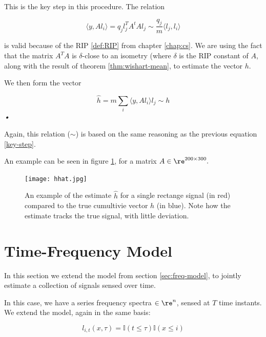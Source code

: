 \begin{remark}
This is the key step in this procedure. The relation 

\begin{equation}
\langle y, Al_i\rangle = q_j  l_j^TA^tAl_j \sim \frac{q_j}{m} \langle l_j, l_i \rangle
\end{equation}

is valid because of the RIP \eqref{def:RIP} from chapter \ref{chap:cs}. We are using the fact that the matrix \(A^TA\) is \(\delta\)-close to an isometry (where \(\delta\) is the RIP constant of \(A\), along with the result of theorem \eqref{thm:wishart-mean}, to estimate the vector \(h\).

\end{remark}
We then form the vector 

\begin{equation}
\hat{h} = m \sum_i \langle y, Al_i\rangle l_j \sim h
\label{ss-estimator}
\end{equation}\textit{•}

Again, this relation (\(\sim\)) is based on the same reasoning as the previous equation \eqref{key-step}.

An example can be seen in figure \ref{fig:hhat}, for a matrix \(A \in \re^{200 \times 300}.\)

\begin{figure}[h]
\centering
\texttt{[image: hhat.jpg]}
\caption{}
\label{fig:hhat}
\caption{An example of the estimate \(\hat{h}\) for a single rectange signal (in red) compared to the true cumultivie vector \(h\) (in blue). Note how the estimate tracks the true signal, with little deviation.}
\end{figure}

\section{Time-Frequency Model}
In this section we extend the model from section \ref{sec:freq-model}, to jointly estimate a collection of signals sensed over time. 

In this case, we have a series frequency spectra \(\in \re^n\), sensed at \(T\) time instants. We extend the model, again in the same basis:


\begin{equation}
l_{i,t}\left(x, \tau\right) = \mathbb{I}\left(t \leq \tau \right)\mathbb{I}\left(x \leq i\right)
\label{time-freq basis}
\end{equation}

